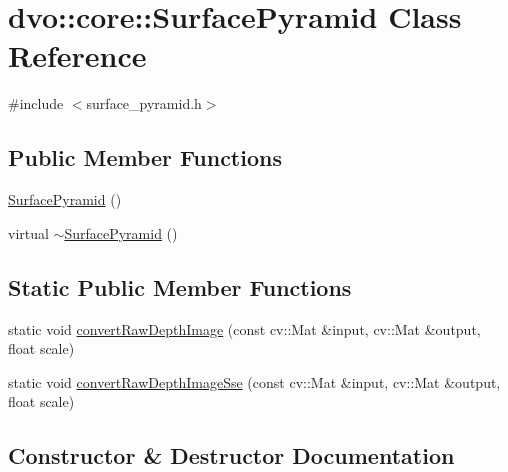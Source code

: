 \hypertarget{classdvo_1_1core_1_1_surface_pyramid}{}\section{dvo\+:\+:core\+:\+:Surface\+Pyramid Class Reference}
\label{classdvo_1_1core_1_1_surface_pyramid}


{\ttfamily \#include $<$surface\+\_\+pyramid.\+h$>$}

\subsection*{Public Member Functions}
\begin{DoxyCompactItemize}
\item 
\mbox{\hyperlink{classdvo_1_1core_1_1_surface_pyramid_a6305b39dff4dc0afc7f606ebdb9a74c6}{Surface\+Pyramid}} ()
\item 
virtual \mbox{\hyperlink{classdvo_1_1core_1_1_surface_pyramid_ac927314b7bd60a8c78d1fa8641aa91e1}{$\sim$\+Surface\+Pyramid}} ()
\end{DoxyCompactItemize}
\subsection*{Static Public Member Functions}
\begin{DoxyCompactItemize}
\item 
static void \mbox{\hyperlink{classdvo_1_1core_1_1_surface_pyramid_a3dc09e63e7fa8c67d5a94b55f3c0f612}{convert\+Raw\+Depth\+Image}} (const cv\+::\+Mat \&input, cv\+::\+Mat \&output, float scale)
\item 
static void \mbox{\hyperlink{classdvo_1_1core_1_1_surface_pyramid_a227439a6f1891fdc29efaf69b1433068}{convert\+Raw\+Depth\+Image\+Sse}} (const cv\+::\+Mat \&input, cv\+::\+Mat \&output, float scale)
\end{DoxyCompactItemize}


\subsection{Constructor \& Destructor Documentation}
\mbox{\label{classdvo_1_1core_1_1_surface_pyramid_a6305b39dff4dc0afc7f606ebdb9a74c6}} 
